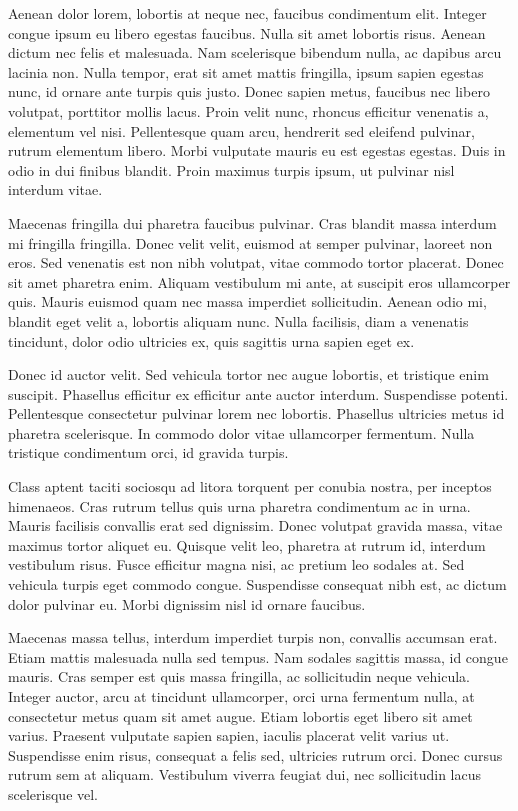 \documentclass[a4paper,12pt]{article}
\begin{document}
Aenean dolor lorem, lobortis at neque nec, faucibus condimentum elit. Integer congue ipsum eu libero egestas faucibus. Nulla sit amet lobortis risus. Aenean dictum nec felis et malesuada. Nam scelerisque bibendum nulla, ac dapibus arcu lacinia non. Nulla tempor, erat sit amet mattis fringilla, ipsum sapien egestas nunc, id ornare ante turpis quis justo. Donec sapien metus, faucibus nec libero volutpat, porttitor mollis lacus. Proin velit nunc, rhoncus efficitur venenatis a, elementum vel nisi. Pellentesque quam arcu, hendrerit sed eleifend pulvinar, rutrum elementum libero. Morbi vulputate mauris eu est egestas egestas. Duis in odio in dui finibus blandit. Proin maximus turpis ipsum, ut pulvinar nisl interdum vitae.

Maecenas fringilla dui pharetra faucibus pulvinar. Cras blandit massa interdum mi fringilla fringilla. Donec velit velit, euismod at semper pulvinar, laoreet non eros. Sed venenatis est non nibh volutpat, vitae commodo tortor placerat. Donec sit amet pharetra enim. Aliquam vestibulum mi ante, at suscipit eros ullamcorper quis. Mauris euismod quam nec massa imperdiet sollicitudin. Aenean odio mi, blandit eget velit a, lobortis aliquam nunc. Nulla facilisis, diam a venenatis tincidunt, dolor odio ultricies ex, quis sagittis urna sapien eget ex.

Donec id auctor velit. Sed vehicula tortor nec augue lobortis, et tristique enim suscipit. Phasellus efficitur ex efficitur ante auctor interdum. Suspendisse potenti. Pellentesque consectetur pulvinar lorem nec lobortis. Phasellus ultricies metus id pharetra scelerisque. In commodo dolor vitae ullamcorper fermentum. Nulla tristique condimentum orci, id gravida turpis.

Class aptent taciti sociosqu ad litora torquent per conubia nostra, per inceptos himenaeos. Cras rutrum tellus quis urna pharetra condimentum ac in urna. Mauris facilisis convallis erat sed dignissim. Donec volutpat gravida massa, vitae maximus tortor aliquet eu. Quisque velit leo, pharetra at rutrum id, interdum vestibulum risus. Fusce efficitur magna nisi, ac pretium leo sodales at. Sed vehicula turpis eget commodo congue. Suspendisse consequat nibh est, ac dictum dolor pulvinar eu. Morbi dignissim nisl id ornare faucibus.

Maecenas massa tellus, interdum imperdiet turpis non, convallis accumsan erat. Etiam mattis malesuada nulla sed tempus. Nam sodales sagittis massa, id congue mauris. Cras semper est quis massa fringilla, ac sollicitudin neque vehicula. Integer auctor, arcu at tincidunt ullamcorper, orci urna fermentum nulla, at consectetur metus quam sit amet augue. Etiam lobortis eget libero sit amet varius. Praesent vulputate sapien sapien, iaculis placerat velit varius ut. Suspendisse enim risus, consequat a felis sed, ultricies rutrum orci. Donec cursus rutrum sem at aliquam. Vestibulum viverra feugiat dui, nec sollicitudin lacus scelerisque vel.
\end{document}
